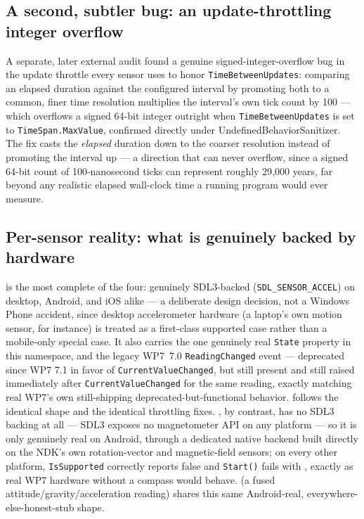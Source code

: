 \subsection{A second, subtler bug: an update-throttling integer overflow}

A separate, later external audit found a genuine signed-integer-overflow bug in the update
throttle every sensor uses to honor \texttt{TimeBetweenUpdates}: comparing an elapsed
duration against the configured interval by promoting both to a common, finer time
resolution multiplies the interval's own tick count by 100 --- which overflows a signed
64-bit integer outright when \texttt{TimeBetweenUpdates} is set to \texttt{TimeSpan.MaxValue},
confirmed directly under UndefinedBehaviorSanitizer. The fix casts the \emph{elapsed}
duration down to the coarser resolution instead of promoting the interval up --- a direction
that can never overflow, since a signed 64-bit count of 100-nanosecond ticks can represent
roughly 29{,}000 years, far beyond any realistic elapsed wall-clock time a running program
would ever measure.

\subsection{Per-sensor reality: what is genuinely backed by hardware}

 is the most complete of the four: genuinely SDL3-backed
(\texttt{SDL\_SENSOR\_ACCEL}) on desktop, Android, and iOS alike --- a deliberate design
decision, not a Windows Phone accident, since desktop accelerometer hardware (a laptop's own
motion sensor, for instance) is treated as a first-class supported case rather than a
mobile-only special case. It also carries the one genuinely real \texttt{State} property in
this namespace, and the legacy WP7~7.0 \texttt{ReadingChanged} event --- deprecated since WP7
7.1 in favor of \texttt{CurrentValueChanged}, but still present and still raised immediately
after \texttt{CurrentValueChanged} for the same reading, exactly matching real WP7's own
still-shipping deprecated-but-functional behavior.  follows the identical
shape and the identical throttling fixes. , by contrast, has no SDL3
backing at all --- SDL3 exposes no magnetometer API on any platform --- so it is only
genuinely real on Android, through a dedicated native backend built directly on the NDK's own
rotation-vector and magnetic-field sensors; on every other platform, \texttt{IsSupported}
correctly reports false and \texttt{Start()} fails with ,
exactly as real WP7 hardware without a compass would behave.  (a fused
attitude/gravity/acceleration reading) shares this same Android-real,
everywhere-else-honest-stub shape.

